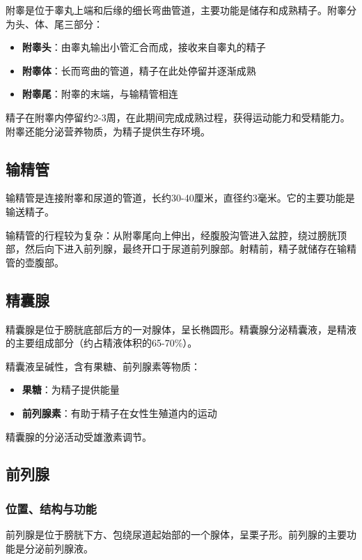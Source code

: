 附睾是位于睾丸上端和后缘的细长弯曲管道，主要功能是储存和成熟精子。附睾分为头、体、尾三部分：
\begin{itemize}
    \item \textbf{附睾头}：由睾丸输出小管汇合而成，接收来自睾丸的精子
    \item \textbf{附睾体}：长而弯曲的管道，精子在此处停留并逐渐成熟
    \item \textbf{附睾尾}：附睾的末端，与输精管相连
\end{itemize}

精子在附睾内停留约2-3周，在此期间完成成熟过程，获得运动能力和受精能力。附睾还能分泌营养物质，为精子提供生存环境。

\subsection{输精管}

输精管是连接附睾和尿道的管道，长约30-40厘米，直径约3毫米。它的主要功能是输送精子。

输精管的行程较为复杂：从附睾尾向上伸出，经腹股沟管进入盆腔，绕过膀胱顶部，然后向下进入前列腺，最终开口于尿道前列腺部。射精前，精子就储存在输精管的壶腹部。

\subsection{精囊腺}

精囊腺是位于膀胱底部后方的一对腺体，呈长椭圆形。精囊腺分泌精囊液，是精液的主要组成部分（约占精液体积的65-70\%）。

精囊液呈碱性，含有果糖、前列腺素等物质：
\begin{itemize}
    \item \textbf{果糖}：为精子提供能量
    \item \textbf{前列腺素}：有助于精子在女性生殖道内的运动
\end{itemize}

精囊腺的分泌活动受雄激素调节。

\subsection{前列腺}
\subsubsection{位置、结构与功能}

前列腺是位于膀胱下方、包绕尿道起始部的一个腺体，呈栗子形。前列腺的主要功能是分泌前列腺液。

